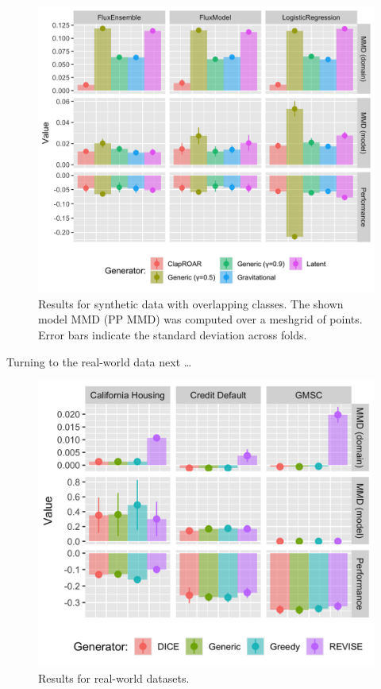 \documentclass[conference,final,]{IEEEtran}
\begin{document}
\begin{figure}

{\centering \includegraphics[width=0.9\linewidth]{www/synthetic_results} 

}

\caption{Results for synthetic data with overlapping classes. The shown model MMD (PP MMD) was computed over a meshgrid of points. Error bars indicate the standard deviation across folds.}\label{fig:syn}
\end{figure}

Turning to the real-world data next \ldots{}

\begin{figure}

{\centering \includegraphics[width=0.9\linewidth]{www/real_world_results} 

}

\caption{Results for real-world datasets.}\label{fig:real}
\end{figure}
\end{document}
